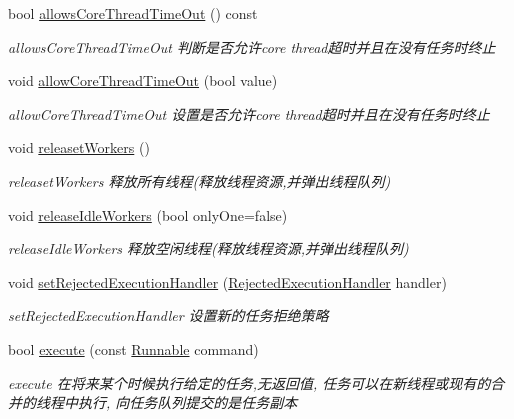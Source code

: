 \begin{DoxyCompactItemize}
bool \hyperlink{classThreadPoolExecutor_acb920195bb39c64c97ed0644693a3592}{allows\+Core\+Thread\+Time\+Out} () const
\begin{DoxyCompactList}\small\item\em allows\+Core\+Thread\+Time\+Out 判断是否允许core thread超时并且在没有任务时终止 \end{DoxyCompactList}\item 
void \hyperlink{classThreadPoolExecutor_aa700bdf61ac6f9a67411560af2871ee7}{allow\+Core\+Thread\+Time\+Out} (bool value)
\begin{DoxyCompactList}\small\item\em allow\+Core\+Thread\+Time\+Out 设置是否允许core thread超时并且在没有任务时终止 \end{DoxyCompactList}\item 
\mbox{\label{classThreadPoolExecutor_a61be4f92c8aff50aaaf1cdc27a75beed}} 
void \hyperlink{classThreadPoolExecutor_a61be4f92c8aff50aaaf1cdc27a75beed}{releaset\+Workers} ()
\begin{DoxyCompactList}\small\item\em releaset\+Workers 释放所有线程(释放线程资源,并弹出线程队列) \end{DoxyCompactList}\item 
void \hyperlink{classThreadPoolExecutor_a0993336e51299da4b9c18d31e45610fe}{release\+Idle\+Workers} (bool only\+One=false)
\begin{DoxyCompactList}\small\item\em release\+Idle\+Workers 释放空闲线程(释放线程资源,并弹出线程队列) \end{DoxyCompactList}\item 
void \hyperlink{classThreadPoolExecutor_ab04e6a91b39073eaafffa8fc22eae325}{set\+Rejected\+Execution\+Handler} (\hyperlink{classRejectedExecutionHandler}{Rejected\+Execution\+Handler} handler)
\begin{DoxyCompactList}\small\item\em set\+Rejected\+Execution\+Handler 设置新的任务拒绝策略 \end{DoxyCompactList}\item 
bool \hyperlink{classThreadPoolExecutor_a04e334b5d7f3b383aa01fbac80120feb}{execute} (const \hyperlink{classRunnable}{Runnable} command)
\begin{DoxyCompactList}\small\item\em execute 在将来某个时候执行给定的任务,无返回值, 任务可以在新线程或现有的合并的线程中执行, 向任务队列提交的是任务副本 \end{DoxyCompactList}\item 

\end{DoxyCompactItemize}
